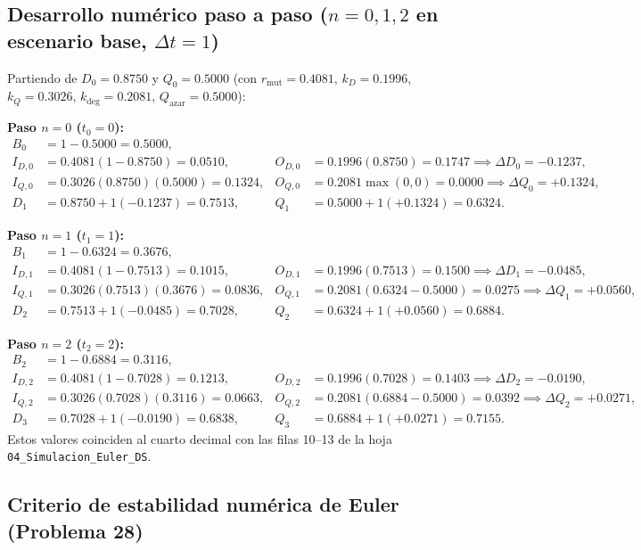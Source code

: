 \documentclass[11pt,a4paper]{article}
\begin{document}
\subsection{Desarrollo num\'erico paso a paso ($n = 0, 1, 2$ en escenario base, $\Delta t = 1$)}

Partiendo de $D_0 = 0.8750$ y $Q_0 = 0.5000$ (con $r_{\text{mut}}=0.4081$, $k_D=0.1996$, $k_Q=0.3026$, $k_{\text{deg}}=0.2081$, $Q_{\text{azar}}=0.5000$):

\textbf{Paso $n = 0$ ($t_0 = 0$):}
\begin{align*}
B_0 &= 1 - 0.5000 = 0.5000, \\
I_{D,0} &= 0.4081(1 - 0.8750) = 0.0510, & O_{D,0} &= 0.1996(0.8750) = 0.1747 \implies \Delta D_0 = -0.1237, \\
I_{Q,0} &= 0.3026(0.8750)(0.5000) = 0.1324, & O_{Q,0} &= 0.2081\max(0, 0) = 0.0000 \implies \Delta Q_0 = +0.1324, \\
D_1 &= 0.8750 + 1(-0.1237) = \mathbf{0.7513}, & Q_1 &= 0.5000 + 1(+0.1324) = \mathbf{0.6324}.
\end{align*}

\textbf{Paso $n = 1$ ($t_1 = 1$):}
\begin{align*}
B_1 &= 1 - 0.6324 = 0.3676, \\
I_{D,1} &= 0.4081(1 - 0.7513) = 0.1015, & O_{D,1} &= 0.1996(0.7513) = 0.1500 \implies \Delta D_1 = -0.0485, \\
I_{Q,1} &= 0.3026(0.7513)(0.3676) = 0.0836, & O_{Q,1} &= 0.2081(0.6324 - 0.5000) = 0.0275 \implies \Delta Q_1 = +0.0560, \\
D_2 &= 0.7513 + 1(-0.0485) = \mathbf{0.7028}, & Q_2 &= 0.6324 + 1(+0.0560) = \mathbf{0.6884}.
\end{align*}

\textbf{Paso $n = 2$ ($t_2 = 2$):}
\begin{align*}
B_2 &= 1 - 0.6884 = 0.3116, \\
I_{D,2} &= 0.4081(1 - 0.7028) = 0.1213, & O_{D,2} &= 0.1996(0.7028) = 0.1403 \implies \Delta D_2 = -0.0190, \\
I_{Q,2} &= 0.3026(0.7028)(0.3116) = 0.0663, & O_{Q,2} &= 0.2081(0.6884 - 0.5000) = 0.0392 \implies \Delta Q_2 = +0.0271, \\
D_3 &= 0.7028 + 1(-0.0190) = \mathbf{0.6838}, & Q_3 &= 0.6884 + 1(+0.0271) = \mathbf{0.7155}.
\end{align*}
Estos valores coinciden al cuarto decimal con las filas 10--13 de la hoja \texttt{04\_Simulacion\_Euler\_DS}.

\subsection{Criterio de estabilidad num\'erica de Euler (Problema 28)}
\end{document}
